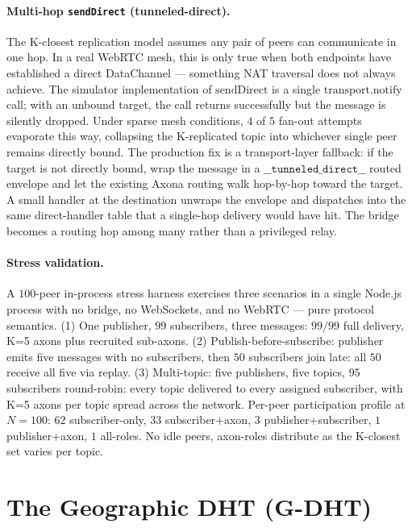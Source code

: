 \documentclass[conference]{IEEEtran}
\newcommand{\axona}{Axona\xspace}
\newcommand{\GDHT}{G-DHT\xspace}
\begin{document}
\paragraph{Multi-hop \texttt{sendDirect} (tunneled-direct).}
The K-closest replication model assumes any pair of peers can
communicate in one hop. In a real WebRTC mesh, this is only true
when both endpoints have established a direct DataChannel ---
something NAT traversal does not always achieve. The simulator
implementation of $\mathrm{sendDirect}$ is a single
$\mathrm{transport.notify}$ call; with an unbound target, the call
returns successfully but the message is silently dropped. Under
sparse mesh conditions, $4$ of $5$ fan-out attempts evaporate this
way, collapsing the K-replicated topic into whichever single peer
remains directly bound. The production fix is a transport-layer
fallback: if the target is not directly bound, wrap the message in
a $\texttt{\_\_tunneled\_direct\_\_}$ routed envelope and let the
existing \axona routing walk hop-by-hop toward the target. A small
handler at the destination unwraps the envelope and dispatches into
the same direct-handler table that a single-hop delivery would
have hit. The bridge becomes a routing hop among many rather than
a privileged relay.

\paragraph{Stress validation.}
A $100$-peer in-process stress harness exercises three scenarios in
a single Node.js process with no bridge, no WebSockets, and no
WebRTC --- pure protocol semantics. (1) One publisher, $99$
subscribers, three messages: $99/99$ full delivery, K=5 axons
plus recruited sub-axons. (2) Publish-before-subscribe: publisher
emits five messages with no subscribers, then $50$ subscribers
join late: all $50$ receive all five via replay. (3) Multi-topic:
five publishers, five topics, $95$ subscribers round-robin: every
topic delivered to every assigned subscriber, with K=5 axons per
topic spread across the network. Per-peer participation profile at
$N=100$: $62$ subscriber-only, $33$ subscriber+axon, $3$
publisher+subscriber, $1$ publisher+axon, $1$ all-roles. No idle
peers, axon-roles distribute as the K-closest set varies per
topic.

\section{The Geographic DHT (\GDHT)}
\label{sec:gdht}
\end{document}
